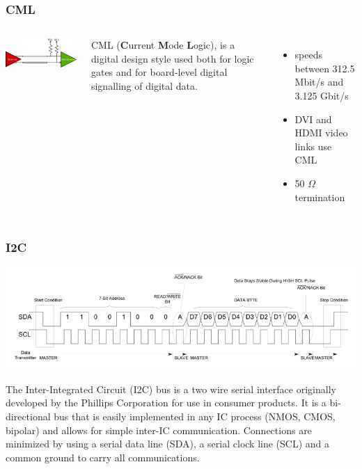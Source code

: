 \documentclass[aspectratio=169]{beamer}
\begin{document}
	\begin{frame}[noframenumbering]
		\frametitle{CML}
		\begin{columns}
			\begin{center}
				\includegraphics[width=0.95 \textwidth]{IMG/CML_line.png}
			\end{center}
			CML (\textbf{C}urrent \textbf{M}ode \textbf{L}ogic), is a digital design style used both for logic gates and for board-level digital signalling of digital data.
			\begin{itemize}
				\item speeds between 312.5 Mbit/s and 3.125 Gbit/s
				\item DVI and HDMI video links use CML
				\item 50 $\Omega$ termination
			\end{itemize}
		\end{columns}
	\end{frame}

	\begin{frame}[noframenumbering]
		\frametitle{I2C}
		\begin{center}
			\includegraphics[width=0.8 \textwidth]{IMG/I2C.png}
		\end{center}
		The Inter-Integrated Circuit (I2C) bus is a two wire serial interface originally developed by the Phillips Corporation for use in consumer products. It is a bi-directional bus that is easily implemented in any IC process (NMOS, CMOS, bipolar) and allows for simple inter-IC communication. Connections are minimized by using a serial data line (SDA), a serial clock line (SCL) and a common ground to carry all communications.
	\end{frame}
\end{document}
